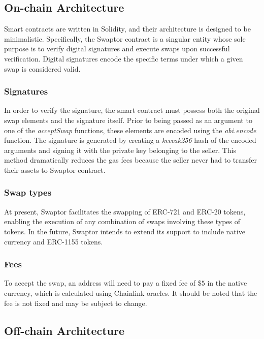 \documentclass[12pt]{article}
\begin{document}
\subsection{On-chain Architecture}

\indent Smart contracts are written in Solidity, and their architecture is designed to be minimalistic.
Specifically, the Swaptor contract is a singular entity whose sole purpose is to verify digital signatures
and execute swaps upon successful verification. Digital signatures encode the specific terms under which a given swap is considered valid.

\subsubsection{Signatures}

In order to verify the signature, the smart contract must possess both the original swap elements
and the signature itself. Prior to being passed as an argument to one of the \textit{acceptSwap} functions,
these elements are encoded using the \textit{abi.encode} function. The signature is generated by creating a
\textit{keccak256} hash of the encoded arguments and signing it with the private key belonging to the seller.
This method dramatically reduces the gas fees because the seller never had to transfer their assets to Swaptor contract.

\subsubsection{Swap types}

At present, Swaptor facilitates the swapping of ERC-721 and ERC-20 tokens, enabling the execution of any combination of swaps involving these types of tokens.
In the future, Swaptor intends to extend its support to include native currency and ERC-1155 tokens.

\subsubsection{Fees}
To accept the swap, an address will need to pay a fixed fee of \$$5$ in the native currency, which is calculated using Chainlink oracles\cite{chainlink}. It should be noted that the fee is not fixed and may be subject to change.

  \subsection{Off-chain Architecture}
\end{document}
